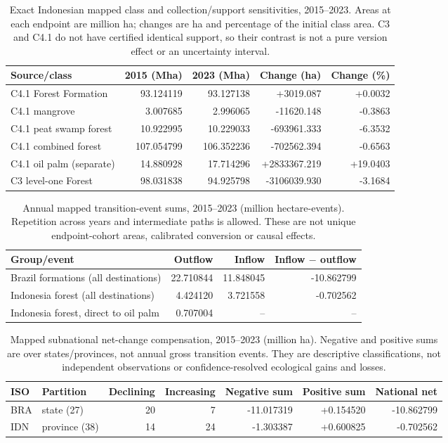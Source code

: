 \begin{table}[htbp]
\centering\small
\caption{Exact Indonesian mapped class and collection/support sensitivities, 2015--2023. Areas at each endpoint are million ha; changes are ha and percentage of the initial class area. C3 and C4.1 do not have certified identical support, so their contrast is not a pure version effect or an uncertainty interval.}\label{tab:SI_Indonesia_classes}
\begin{tabularx}{\textwidth}{lrrrr}\toprule
Source/class & 2015 (Mha) & 2023 (Mha) & Change (ha) & Change (\%)\\\midrule
C4.1 Forest Formation & 93.124119 & 93.127138 & +3019.087 & +0.0032\\
C4.1 mangrove & 3.007685 & 2.996065 & -11620.148 & -0.3863\\
C4.1 peat swamp forest & 10.922995 & 10.229033 & -693961.333 & -6.3532\\
C4.1 combined forest & 107.054799 & 106.352236 & -702562.394 & -0.6563\\
C4.1 oil palm (separate) & 14.880928 & 17.714296 & +2833367.219 & +19.0403\\
C3 level-one Forest & 98.031838 & 94.925798 & -3106039.930 & -3.1684\\
\bottomrule\end{tabularx}
\end{table}
\begin{table}[htbp]
\centering\small
\caption{Annual mapped transition-event sums, 2015--2023 (million hectare-events). Repetition across years and intermediate paths is allowed. These are not unique endpoint-cohort areas, calibrated conversion or causal effects.}\label{tab:SI_transition_events}
\begin{tabularx}{\textwidth}{lrrr}\toprule
Group/event & Outflow & Inflow & Inflow $-$ outflow\\\midrule
Brazil formations (all destinations) & 22.710844 & 11.848045 & -10.862799\\
Indonesia forest (all destinations) & 4.424120 & 3.721558 & -0.702562\\
Indonesia forest, direct to oil palm & 0.707004 & -- & --\\
\bottomrule\end{tabularx}
\end{table}
\begin{table}[htbp]
\centering\small
\caption{Mapped subnational net-change compensation, 2015--2023 (million ha). Negative and positive sums are over states/provinces, not annual gross transition events. They are descriptive classifications, not independent observations or confidence-resolved ecological gains and losses.}\label{tab:SI_regional_compensation}
\begin{tabularx}{\textwidth}{llrrrrr}\toprule
ISO & Partition & Declining & Increasing & Negative sum & Positive sum & National net\\\midrule
BRA & state (27) & 20 & 7 & -11.017319 & +0.154520 & -10.862799\\
IDN & province (38) & 14 & 24 & -1.303387 & +0.600825 & -0.702562\\
\bottomrule\end{tabularx}
\end{table}


